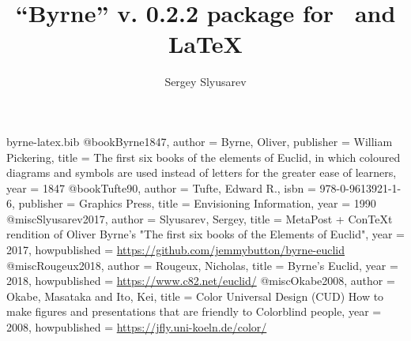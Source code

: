 \begin{filecontents}{byrne-latex.bib}
@book{Byrne1847,
  author = {Byrne, Oliver},
  publisher = {William Pickering},
  title = {{The first six books of the elements of Euclid, in which coloured diagrams and symbols are used instead of letters for the greater ease of learners}},
  year = 1847
}
@book{Tufte90,
  author = {Tufte, Edward R.},
  isbn = {978-0-9613921-1-6},
  publisher = {Graphics Press},
  title = {{Envisioning Information}},
  year = 1990
}
@misc{Slyusarev2017,
  author = {Slyusarev, Sergey},
  title = {{MetaPost + ConTeXt rendition of Oliver Byrne's "The first six books of the Elements of Euclid"}},
  year = {2017},
  howpublished = {\url{https://github.com/jemmybutton/byrne-euclid}}
}
@misc{Rougeux2018,
  author = {Rougeux, Nicholas},
  title = {{Byrne’s Euclid}},
  year = {2018},
  howpublished = {\url{https://www.c82.net/euclid/}}
}
@misc{Okabe2008,
  author = {Okabe, Masataka and Ito, Kei},
  title = {{Color Universal Design (CUD) How to make figures and presentations that are friendly to Colorblind people}},
  year = {2008},
  howpublished = {\url{https://jfly.uni-koeln.de/color/}}
}
\end{filecontents}

\documentclass{ltxdoc}
\usepackage{byrne}
\usepackage{ccicons,bxtexlogo,listings,hyperref}
\hypersetup{
     colorlinks=true,
     linkcolor=blue,
     filecolor=blue,
     citecolor = black,      
     urlcolor=cyan,
     }

\lstset{
language=MetaPost,
alsolanguage=TeX,
numbers=none,
basicstyle=\ttfamily\scriptsize
}

\def\mpPre{textLabels := true;}

\author{Sergey Slyusarev}
\title{``Byrne'' v. 0.2.2 package for \METAPOST\ and \LaTeX}


\maketitle

\begin{abstract}
This document describes ``Byrne'' package for \METAPOST\ and \LaTeX.
\end{abstract}

\begin{centering}

This document is distributed under CC-BY-SA 4.0 license 

\ccbysa 

\href{https://github.com/jemmybutton/byrne-latex}{https://github.com/jemmybutton/byrne-latex}

\end{centering}

